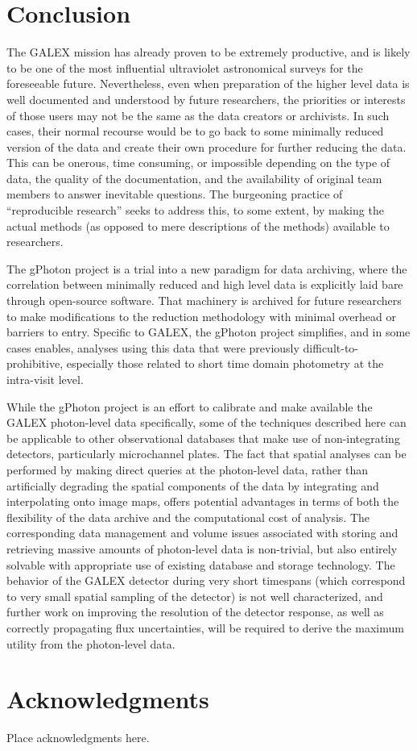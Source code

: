 \documentclass[5p]{elsarticle}
\begin{document}
\section{Conclusion}

The GALEX mission has already proven to be extremely productive, and is likely to be one of the most influential ultraviolet astronomical surveys for the foreseeable future.  Nevertheless, even when preparation of the higher level data is well documented and understood by future researchers, the priorities or interests of those users may not be the same as the data creators or archivists. In such cases, their normal recourse would be to go back to some minimally reduced version of the data and create their own procedure for further reducing the data. This can be onerous, time consuming, or impossible depending on the type of data, the quality of the documentation, and the availability of original team members to answer inevitable questions. The burgeoning practice of ``reproducible research'' seeks to address this, to some extent, by making the actual methods (as opposed to mere descriptions of the methods) available to researchers.

The gPhoton project is a trial into a new paradigm for data archiving, where the correlation between minimally reduced and high level data is explicitly laid bare through open-source software.  That machinery is archived for future researchers to make modifications to the reduction methodology with minimal overhead or barriers to entry.  Specific to GALEX, the gPhoton project simplifies, and in some cases enables, analyses using this data that were previously difficult-to-prohibitive, especially those related to short time domain photometry at the intra-visit level.

While the gPhoton project is an effort to calibrate and make available the GALEX photon-level data specifically, some of the techniques described here can be applicable to other observational databases that make use of non-integrating detectors, particularly microchannel plates. The fact that spatial analyses can be performed by making direct queries at the photon-level data, rather than artificially degrading the spatial components of the data by integrating and interpolating onto image maps, offers potential advantages in terms of both the flexibility of the data archive and the computational cost of analysis. The corresponding data management and volume issues associated with storing and retrieving massive amounts of photon-level data is non-trivial, but also entirely solvable with appropriate use of existing database and storage technology. The behavior of the GALEX detector during very short timespans (which correspond to very small spatial sampling of the detector) is not well characterized, and further work on improving the resolution of the detector response, as well as correctly propagating flux uncertainties, will be required to derive the maximum utility from the photon-level data.

\section{Acknowledgments}
{\color{red}Place acknowledgments here.}


\end{document}
